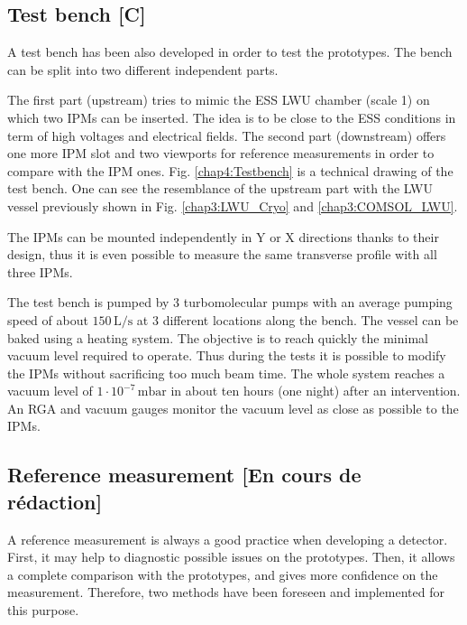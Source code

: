 \begin{refsection}

  

  \subsection{Test bench [C]}
  A test bench has been also developed in order to test the prototypes. The bench can be split into two different independent parts.

  The first part (upstream) tries to mimic the ESS LWU chamber (scale 1) on which two IPMs can be inserted. The idea is to be close to the ESS conditions in term of high voltages and electrical fields. The second part (downstream) offers one more IPM slot and two viewports for reference measurements in order to compare with the IPM ones. Fig. \ref{chap4:Testbench} is a technical drawing of the test bench. One can see the resemblance of the upstream part with the LWU vessel previously shown in Fig. \ref{chap3:LWU_Cryo} and \ref{chap3:COMSOL_LWU}.


  The IPMs can be mounted independently in Y or X directions thanks to their design, thus it is even possible to measure the same transverse profile with all three IPMs.

  

  The test bench is pumped by 3 turbomolecular pumps with an average pumping speed of about $150\,\mathrm{L/s}$ at 3 different locations along the bench. The vessel can be baked using a heating system. The objective is to reach quickly the minimal vacuum level required to operate. Thus during the tests it is possible to modify the IPMs without sacrificing too much beam time. The whole system reaches a vacuum level of $1\cdot 10^{-7}\,\mathrm{mbar}$ in about ten hours (one night) after an intervention. An RGA and vacuum gauges monitor the vacuum level as close as possible to the IPMs.

  \subsection{Reference measurement [En cours de rédaction]}
  A reference measurement is always a good practice when developing a detector. First, it may help to diagnostic possible issues on the prototypes. Then, it allows a complete comparison with the prototypes, and gives more confidence on the measurement. Therefore, two methods have been foreseen and implemented for this purpose.


\end{refsection}
